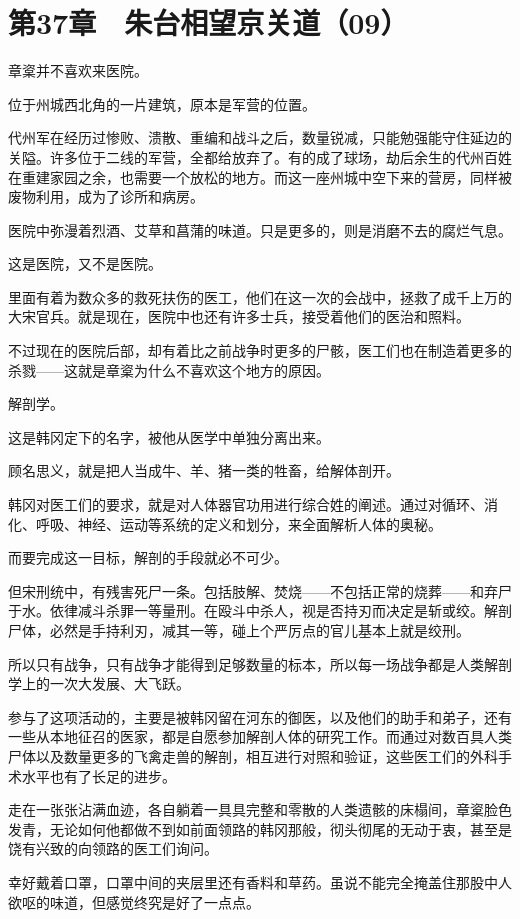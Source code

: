\section{第37章　朱台相望京关道（09）}

章楶并不喜欢来医院。

位于州城西北角的一片建筑，原本是军营的位置。

代州军在经历过惨败、溃散、重编和战斗之后，数量锐减，只能勉强能守住延边的关隘。许多位于二线的军营，全都给放弃了。有的成了球场，劫后余生的代州百姓在重建家园之余，也需要一个放松的地方。而这一座州城中空下来的营房，同样被废物利用，成为了诊所和病房。

医院中弥漫着烈酒、艾草和菖蒲的味道。只是更多的，则是消磨不去的腐烂气息。

这是医院，又不是医院。

里面有着为数众多的救死扶伤的医工，他们在这一次的会战中，拯救了成千上万的大宋官兵。就是现在，医院中也还有许多士兵，接受着他们的医治和照料。

不过现在的医院后部，却有着比之前战争时更多的尸骸，医工们也在制造着更多的杀戮——这就是章楶为什么不喜欢这个地方的原因。

解剖学。

这是韩冈定下的名字，被他从医学中单独分离出来。

顾名思义，就是把人当成牛、羊、猪一类的牲畜，给解体剖开。

韩冈对医工们的要求，就是对人体器官功用进行综合姓的阐述。通过对循环、消化、呼吸、神经、运动等系统的定义和划分，来全面解析人体的奥秘。

而要完成这一目标，解剖的手段就必不可少。

但宋刑统中，有残害死尸一条。包括肢解、焚烧——不包括正常的烧葬——和弃尸于水。依律减斗杀罪一等量刑。在殴斗中杀人，视是否持刃而决定是斩或绞。解剖尸体，必然是手持利刃，减其一等，碰上个严厉点的官儿基本上就是绞刑。

所以只有战争，只有战争才能得到足够数量的标本，所以每一场战争都是人类解剖学上的一次大发展、大飞跃。

参与了这项活动的，主要是被韩冈留在河东的御医，以及他们的助手和弟子，还有一些从本地征召的医家，都是自愿参加解剖人体的研究工作。而通过对数百具人类尸体以及数量更多的飞禽走兽的解剖，相互进行对照和验证，这些医工们的外科手术水平也有了长足的进步。

走在一张张沾满血迹，各自躺着一具具完整和零散的人类遗骸的床榻间，章楶脸色发青，无论如何他都做不到如前面领路的韩冈那般，彻头彻尾的无动于衷，甚至是饶有兴致的向领路的医工们询问。

幸好戴着口罩，口罩中间的夹层里还有香料和草药。虽说不能完全掩盖住那股中人欲呕的味道，但感觉终究是好了一点点。


